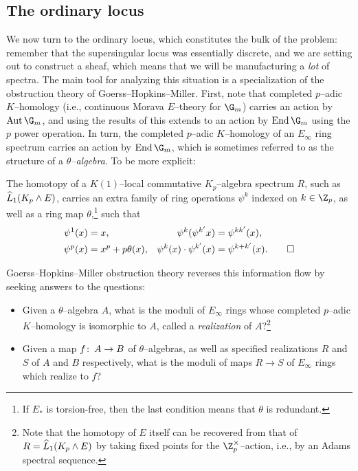 \subsection*{The ordinary locus}

We now turn to the ordinary locus, which constitutes the bulk of the problem: remember that the supersingular locus was essentially discrete, and we are setting out to construct a sheaf, which means that we will be manufacturing a \emph{lot} of spectra.  The main tool for analyzing this situation is a specialization of the obstruction theory of Goerss--Hopkins--Miller.  First, note that completed $p$--adic $K$--homology (i.e., continuous Morava $E$--theory for $\G_m$) carries an action by $\Aut \G_m$, and using the results of  this extends to an action by $\End \G_m$ using the $p${\th} power operation.  In turn, the completed $p$--adic $K$--homology of an $E_\infty$ ring spectrum carries an action by $\End \G_m$, which is sometimes referred to as the structure of a \textit{$\theta$--algebra}.  To be more explicit:
\begin{theorem}[McClure]
The homotopy of a $K(1)$--local commutative $K_p$--algebra spectrum $R$, such as $\widehat L_1 (K_p \wedge E)$, carries an extra family of ring operations $\psi^k$ indexed on $k \in \Z_p$, as well as a ring map $\theta$,\footnote{If $E_*$ is torsion-free, then the last condition means that $\theta$ is redundant.} such that
\pushQED{\qed}
\begin{align*}
\psi^1(x) & = x, &
\psi^k (\psi^{k'} x) & = \psi^{kk'}(x), \\
\psi^p(x) & = x^p + p\theta(x), &
\psi^k(x) \cdot \psi^{k'}(x) & = \psi^{k + k'}(x). \qedhere
\end{align*}
\popQED
\end{theorem}
\noindent Goerss--Hopkins--Miller obstruction theory reverses this information flow by seeking answers to the questions:
\begin{itemize}
    \item Given a $\theta$--algebra $A$, what is the moduli of $E_\infty$ rings whose completed $p$--adic $K$--homology is isomorphic to $A$, called a \textit{realization} of $A$?\footnote{Note that the homotopy of $E$ itself can be recovered from that of $R = \widehat L_1 (K_p \wedge E)$ by taking fixed points for the $\Z_p^\times$--action, i.e., by an Adams spectral sequence.}
    \item Given a map $f\colon\thinspace A \to B$ of $\theta$--algebras, as well as specified realizations $R$ and $S$ of $A$ and $B$ respectively, what is the moduli of maps $R \to S$ of $E_\infty$ rings which realize to $f$?
\end{itemize}

